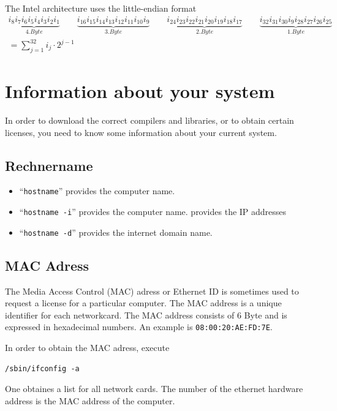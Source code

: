 \documentclass[a4paper,10pt]{report}
\newcommand{\mytt}[1]{{\tt #1}}
\begin{document}
The Intel architecture uses the little-endian format
\begin{eqnarray}
\underbrace{i_{8}i_{7}i_{6}i_{5}i_{4}i_{3}i_{2}i_{1}}_{4. Byte}
\qquad
\underbrace{i_{16}i_{15}i_{14}i_{13}i_{12}i_{11}i_{10}i_{9}}_{3. Byte}
\qquad
\underbrace{i_{24}i_{23}i_{22}i_{21}i_{20}i_{19}i_{18}i_{17}}_{2. Byte}
\qquad
\underbrace{i_{32}i_{31}i_{30}i_{9}i_{28}i_{27}i_{26}i_{25}}_{1.Byte}
\\
=\sum_{j=1}^{32} i_j\cdot 2^{j-1}
\end{eqnarray}

\section{Information about your system}
In order to download the correct compilers and libraries, or to obtain
certain licenses, you need to know some information about your current
system.

\subsection{Rechnername}
\begin{itemize}
\item  ``\mytt{hostname}'' provides the computer name.
\item  ``\mytt{hostname -i}'' provides the computer name. provides the IP addresses
\item  ``\mytt{hostname -d}'' provides the internet domain name.
\end{itemize}

\subsection{MAC Adress}

The Media Access Control (MAC) adress or Ethernet ID is sometimes used
to request a license for a particular computer. The MAC address is a
unique identifier for each networkcard. The MAC address consists of 6
Byte and is expressed in hexadecimal numbers.  An example is
\mytt{08:00:20:AE:FD:7E}.

In order to obtain the  MAC adress, execute
\begin{verbatim}
/sbin/ifconfig -a
\end{verbatim}
One obtaines a list for all network cards. The number of the ethernet
hardware address is the MAC address of the computer.
\end{document}
